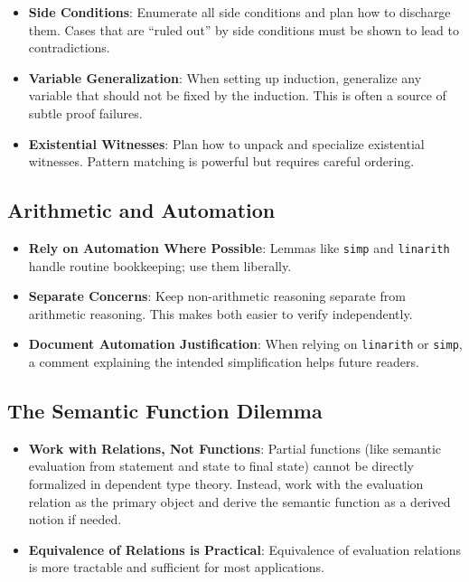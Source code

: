 \begin{itemize}
    \item \textbf{Side Conditions}:
    Enumerate all side conditions and plan how to discharge them.
    Cases that are ``ruled out'' by side conditions must be shown to
    lead to contradictions.
    
    \item \textbf{Variable Generalization}:
    When setting up induction, generalize any variable that should
    not be fixed by the induction. This is often a source of subtle
    proof failures.
    
    \item \textbf{Existential Witnesses}:
    Plan how to unpack and specialize existential witnesses.
    Pattern matching is powerful but requires careful ordering.
\end{itemize}

\subsection*{Arithmetic and Automation}

\begin{itemize}
    \item \textbf{Rely on Automation Where Possible}:
    Lemmas like \texttt{simp} and \texttt{linarith} handle routine bookkeeping;
    use them liberally.
    
    \item \textbf{Separate Concerns}:
    Keep non-arithmetic reasoning separate from arithmetic reasoning.
    This makes both easier to verify independently.
    
    \item \textbf{Document Automation Justification}:
    When relying on \texttt{linarith} or \texttt{simp},
    a comment explaining the intended simplification helps future readers.
\end{itemize}

\subsection*{The Semantic Function Dilemma}

\begin{itemize}
    \item \textbf{Work with Relations, Not Functions}:
    Partial functions (like semantic evaluation from statement and state
    to final state) cannot be directly formalized in dependent type theory.
    Instead, work with the evaluation relation as the primary object
    and derive the semantic function as a derived notion if needed.

    \item \textbf{Equivalence of Relations is Practical}:
    Equivalence of evaluation relations is more tractable and sufficient
    for most applications.
\end{itemize}

